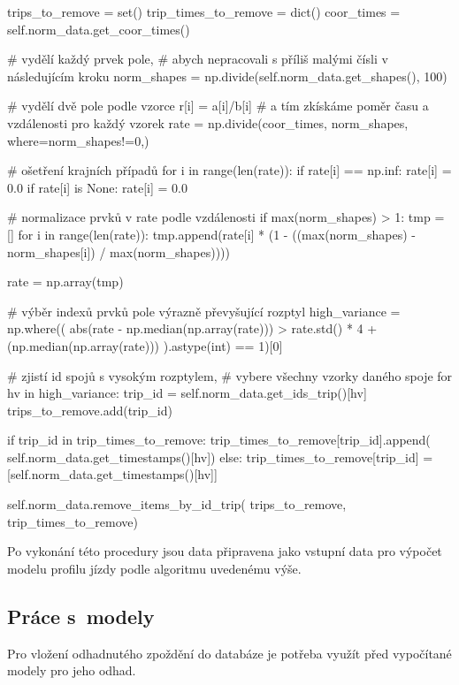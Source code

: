 \begin{code}[frame=none]
trips_to_remove = set()
trip_times_to_remove = dict()
coor_times = self.norm_data.get_coor_times()

# vydělí každý prvek pole,
# abych nepracovali s příliš malými čísli v následujícím kroku
norm_shapes = np.divide(self.norm_data.get_shapes(), 100)

# vydělí dvě pole podle vzorce r[i] = a[i]/b[i]
# a tím zkískáme poměr času a vzdálenosti pro každý vzorek
rate = np.divide(coor_times, norm_shapes, where=norm_shapes!=0,)

# ošetření krajních případů
for i in range(len(rate)):
  if rate[i] == np.inf:
    rate[i] = 0.0
  if rate[i] is None:
    rate[i] = 0.0

# normalizace prvků v rate podle vzdálenosti
if max(norm_shapes) > 1:
  tmp = []
  for i in range(len(rate)):
    tmp.append(rate[i] * (1 - ((max(norm_shapes) -
	  norm_shapes[i]) / max(norm_shapes))))

  rate = np.array(tmp)

# výběr indexů prvků pole výrazně převyšující rozptyl
high_variance = np.where((
  abs(rate - np.median(np.array(rate))) >
    rate.std() * 4 + (np.median(np.array(rate)))
  ).astype(int) == 1)[0]

# zjistí id spojů s vysokým rozptylem,
# vybere všechny vzorky daného spoje
for hv in high_variance:
  trip_id = self.norm_data.get_ids_trip()[hv]
  trips_to_remove.add(trip_id)

  if trip_id in trip_times_to_remove:
    trip_times_to_remove[trip_id].append(
	  self.norm_data.get_timestamps()[hv])
  else:
    trip_times_to_remove[trip_id] =
	  [self.norm_data.get_timestamps()[hv]]

self.norm_data.remove_items_by_id_trip(
  trips_to_remove, trip_times_to_remove)
\end{code}


\bigbreak


Po vykonání této procedury jsou data připravena jako vstupní data pro výpočet modelu profilu jízdy podle algoritmu uvedenému výše.


\subsection{Práce s~modely}


Pro vložení odhadnutého zpoždění do databáze je potřeba využít před vypočítané modely pro jeho odhad.


\bigbreak



